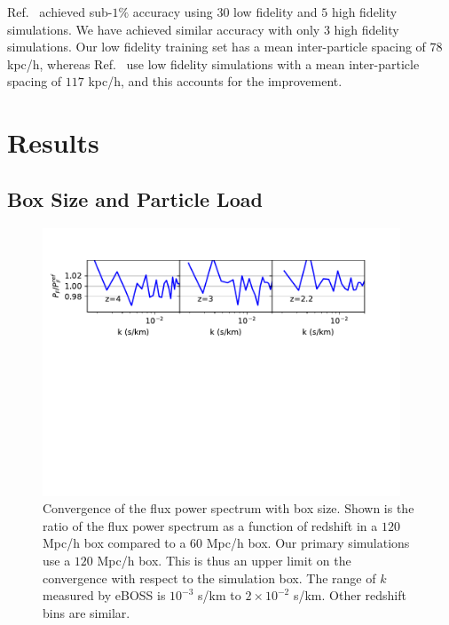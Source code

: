\documentclass[a4paper,11pt]{article}
\begin{document}
Ref.~\cite{Fernandez:2022} achieved sub-$1\%$ accuracy using $30$ low fidelity and $5$ high fidelity simulations. We have achieved similar accuracy with only $3$ high fidelity simulations. Our low fidelity training set has a mean inter-particle spacing of $78$ kpc/h, whereas Ref.~\cite{Fernandez:2022} use low fidelity simulations with a mean inter-particle spacing of $117$ kpc/h, and this accounts for the improvement.


\section{Results}

\subsection{Box Size and Particle Load}
\label{sec:boxsize}

\begin{figure}
\includegraphics[width=0.95\textwidth,trim={0 7cm 1cm 0},clip]{figures/box-convergence.pdf}
 \caption{Convergence of the flux power spectrum with box size. Shown is the ratio of the flux power spectrum as a function of redshift in a $120$ Mpc/h box compared to a $60$ Mpc/h box. Our primary simulations use a $120$ Mpc/h box. This is thus an upper limit on the convergence with respect to the simulation box. The range of $k$ measured by eBOSS is $10^{-3}$ s/km to $2\times 10^{-2}$ s/km. Other redshift bins are similar.}
 \label{fig:boxsize}
\end{figure}
\end{document}

